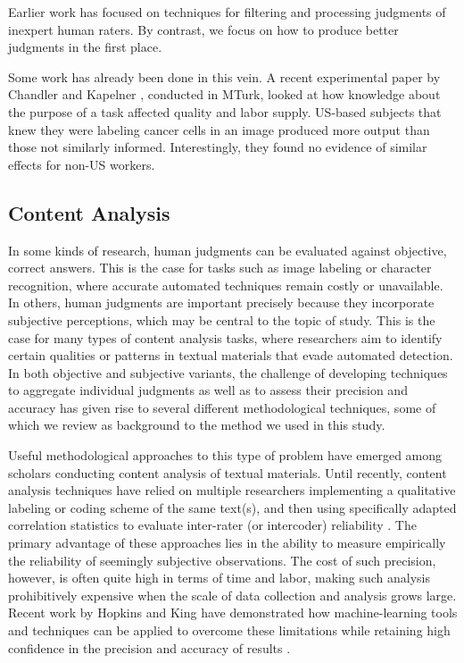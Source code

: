 \documentclass{chi2009}
\begin{document}
Earlier work \cite{von2004labeling, ipeirotis2010, snow2008cheap,
  Hopkins-King2010} has focused on techniques for filtering and
processing judgments of inexpert human raters. By contrast, we focus
on how to produce better judgments in the first place.

Some work has already been done in this vein. A recent experimental
paper by Chandler and Kapelner \cite{chandler2010}, conducted in
MTurk, looked at how knowledge about the purpose of a task affected
quality and labor supply. US-based subjects that knew they were
labeling cancer cells in an image produced more output than those not
similarly informed.  Interestingly, they found no evidence of similar
effects for non-US workers.
\subsection{Content Analysis}
In some kinds of research, human judgments can be evaluated against
objective, correct answers. This is the case for tasks such as image
labeling or character recognition, where accurate automated techniques
remain costly or unavailable. In others, human judgments are important
precisely because they incorporate subjective perceptions, which may
be central to the topic of study. This is the case for many types of
content analysis tasks, where researchers aim to identify certain
qualities or patterns in textual materials that evade automated
detection. In both objective and subjective variants, the challenge of
developing techniques to aggregate individual judgments as well as to
assess their precision and accuracy has given rise to several
different methodological techniques, some of which we review as
background to the method we used in this study.

Useful methodological approaches to this type of problem have emerged
among scholars conducting content analysis of textual materials. Until
recently, content analysis techniques have relied on multiple
researchers implementing a qualitative labeling or coding scheme of
the same text(s), and then using specifically adapted correlation
statistics to evaluate inter-rater (or intercoder) reliability
\cite{krippendorff_content_2003, cohen_coefficient_1960}. The primary
advantage of these approaches lies in the ability to measure
empirically the reliability of seemingly subjective observations. The
cost of such precision, however, is often quite high in terms of time
and labor, making such analysis prohibitively expensive when the scale
of data collection and analysis grows large. Recent work by Hopkins
and King have demonstrated how machine-learning tools and techniques
can be applied to overcome these limitations while retaining high
confidence in the precision and accuracy of results
\cite{Hopkins-King2010}.
\end{document}
